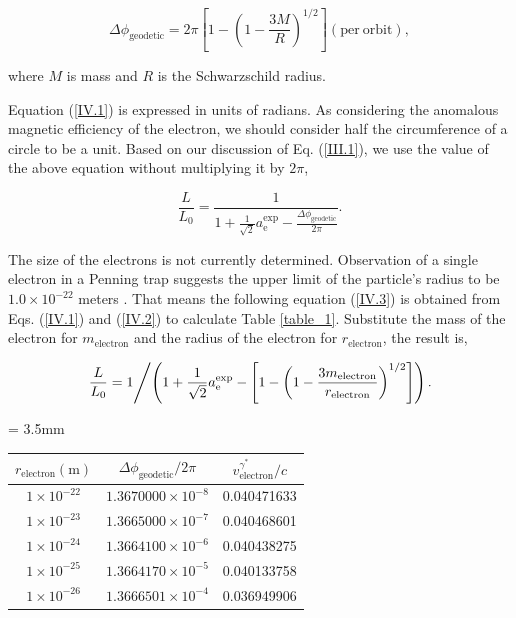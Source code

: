 \documentclass[%
 reprint,
 amsmath,amssymb,
 aps,
]{revtex4-1}
\numberwithin{equation}{section}%
\begin{document}
\begin{equation}
    \Delta \phi_{\mathrm{geodetic}} = 2 \pi \left[ 1 - \left( 1 - \frac{3M}{R} \right)^{1/2} \right] \mathrm{(per \ orbit)},
    \label{IV.1}
\end{equation}

\noindent where $M$ is mass and $R$ is the Schwarzschild radius.


Equation (\ref{IV.1}) is expressed in units of radians. As considering the anomalous magnetic efficiency of the electron, we should consider half the circumference of a circle to be a unit. Based on our discussion of Eq. (\ref{III.1}), we use the value of the above equation without multiplying it by $2 \pi$,

\begin{equation}
    \frac{L}{L_0} = \frac{1}{1 + \frac{1}{\sqrt{2}}a^{\text{exp}}_{\text{e}} - \frac{\Delta \phi_{\mathrm{geodetic}}}{2 \pi}} .
    \label{IV.2}
\end{equation}


The size of the electrons is not currently determined. Observation of a single electron in a Penning trap suggests the upper limit of the particle's radius to be $1.0 \times 10^{-22}$ meters \cite{Dehmelt}. That means the following equation (\ref{IV.3}) is obtained from Eqs. (\ref{IV.1}) and (\ref{IV.2}) to calculate Table \ref{table_1}.  Substitute the mass of the electron for $m_{\mathrm{electron}}$ and the radius of the electron for $r_{\mathrm{electron}}$, the result is,

\begin{equation}
    \left.
    \frac{L}{L_0} = 1
    \middle/
    \left( {1 + \frac{1}{\sqrt{2}}a^{\text{exp}}_{\text{e}} - \left[ 1 - \left( 1 - \frac{3 m_{\mathrm{electron}}}{r_{\mathrm{electron}}} \right)^{1/2} \right]} \right).
    \right.
    \label{IV.3}
\end{equation}

\begin{center}
    \begin{threeparttable}
        \caption{The velocity and the radius of an electron}
        \label{table_1}
        \tabcolsep = 3.5mm
        \renewcommand\arraystretch{1.2}
        \begin{tabular}{ccc}
            \hline
        $ r_{\mathrm{electron}} {\mathrm{(m)}}$ & $\Delta \phi_{\mathrm{geodetic}}/{2 \pi}$ & $ v_{\text{electron}}^{\gamma^{*}} / c$ \\       \hline
        $1 \times 10^{-22}$ & $1.3670000 \times 10^{-8}$ & 0.040471633 \\ 
        $1 \times 10^{-23}$ & $1.3665000 \times 10^{-7}$ & 0.040468601 \\ 
        $1 \times 10^{-24}$ & $1.3664100 \times 10^{-6}$ & 0.040438275 \\ 
        $1 \times 10^{-25}$ & $1.3664170 \times 10^{-5}$ & 0.040133758 \\ 
        $1 \times 10^{-26}$ & $1.3666501 \times 10^{-4}$ & 0.036949906 \\ 
            \hline
        \end{tabular}
    \end{threeparttable}
\end{center}
\end{document}
